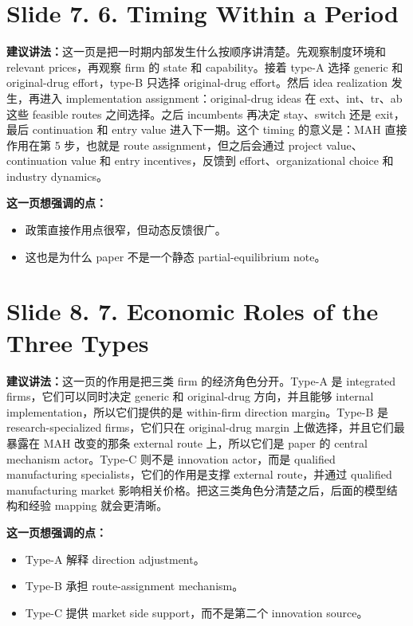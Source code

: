\documentclass[12pt]{ctexart}
\begin{document}
\newpage
\section*{Slide 7. 6. Timing Within a Period}
\textbf{建议讲法：}这一页是把一时期内部发生什么按顺序讲清楚。先观察制度环境和 relevant prices，再观察 firm 的 state 和 capability。接着 type-A 选择 generic 和 original-drug effort，type-B 只选择 original-drug effort。然后 idea realization 发生，再进入 implementation assignment：original-drug ideas 在 ext、int、tr、ab 这些 feasible routes 之间选择。之后 incumbents 再决定 stay、switch 还是 exit，最后 continuation 和 entry value 进入下一期。这个 timing 的意义是：MAH 直接作用在第 5 步，也就是 route assignment，但之后会通过 project value、continuation value 和 entry incentives，反馈到 effort、organizational choice 和 industry dynamics。

\vspace{0.5em}
\textbf{这一页想强调的点：}
\begin{itemize}
\item 政策直接作用点很窄，但动态反馈很广。
\item 这也是为什么 paper 不是一个静态 partial-equilibrium note。
\end{itemize}

\newpage
\section*{Slide 8. 7. Economic Roles of the Three Types}
\textbf{建议讲法：}这一页的作用是把三类 firm 的经济角色分开。Type-A 是 integrated firms，它们可以同时决定 generic 和 original-drug 方向，并且能够 internal implementation，所以它们提供的是 within-firm direction margin。Type-B 是 research-specialized firms，它们只在 original-drug margin 上做选择，并且它们最暴露在 MAH 改变的那条 external route 上，所以它们是 paper 的 central mechanism actor。Type-C 则不是 innovation actor，而是 qualified manufacturing specialists，它们的作用是支撑 external route，并通过 qualified manufacturing market 影响相关价格。把这三类角色分清楚之后，后面的模型结构和经验 mapping 就会更清晰。

\vspace{0.5em}
\textbf{这一页想强调的点：}
\begin{itemize}
\item Type-A 解释 direction adjustment。
\item Type-B 承担 route-assignment mechanism。
\item Type-C 提供 market side support，而不是第二个 innovation source。
\end{itemize}
\end{document}

